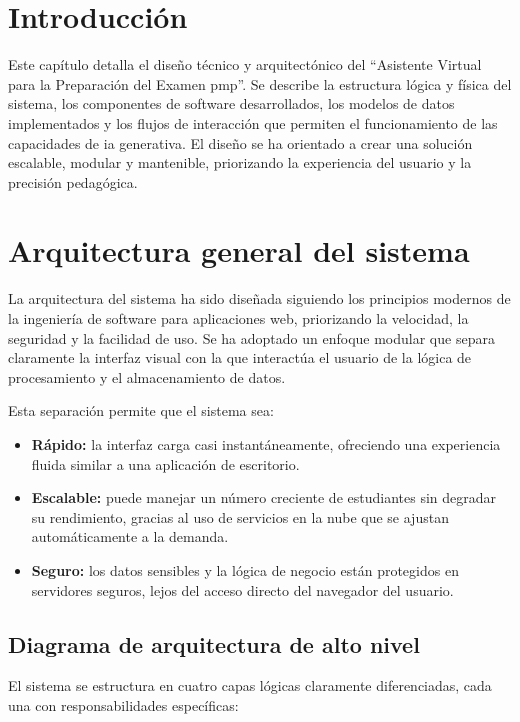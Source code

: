 \section{Introducción}
Este capítulo detalla el diseño técnico y arquitectónico del ``Asistente Virtual para la Preparación del Examen \gls{pmp}''. Se describe la estructura lógica y física del sistema, los componentes de software desarrollados, los modelos de datos implementados y los flujos de interacción que permiten el funcionamiento de las capacidades de \gls{ia} generativa. El diseño se ha orientado a crear una solución escalable, modular y mantenible, priorizando la experiencia del usuario y la precisión pedagógica.

\section{Arquitectura general del sistema}
La arquitectura del sistema ha sido diseñada siguiendo los principios modernos de la ingeniería de software para aplicaciones web, priorizando la velocidad, la seguridad y la facilidad de uso. Se ha adoptado un enfoque modular que separa claramente la interfaz visual con la que interactúa el usuario de la lógica de procesamiento y el almacenamiento de datos.

Esta separación permite que el sistema sea:
\begin{itemize}
\item \textbf{Rápido:} la interfaz carga casi instantáneamente, ofreciendo una experiencia fluida similar a una aplicación de escritorio.
\item \textbf{Escalable:} puede manejar un número creciente de estudiantes sin degradar su rendimiento, gracias al uso de servicios en la nube que se ajustan automáticamente a la demanda.
\item \textbf{Seguro:} los datos sensibles y la lógica de negocio están protegidos en servidores seguros, lejos del acceso directo del navegador del usuario.
\end{itemize}

\subsection{Diagrama de arquitectura de alto nivel}
El sistema se estructura en cuatro capas lógicas claramente diferenciadas, cada una con responsabilidades específicas:

